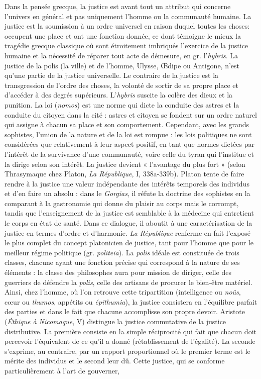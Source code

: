 Dans la pensée grecque, la justice est
avant tout un attribut qui concerne l’univers en général et pas uniquement
l’homme ou la communauté humaine. La
justice est la soumission à un ordre universel en raison duquel toutes les choses:
occupent une place et ont une fonction
donnée, ce dont témoigne le mieux la tragédie grecque classique où sont étroitement imbriqués l’exercice de la justice
humaine et la nécessité de réparer tout
acte de démesure, en gr. l’{\it hybris}. La justice de la polis (la ville) et de l’homme,
Ulysse, Œdipe ou Antigone, n’est qu’une
partie de la justice universelle. Le
contraire de la justice est la transgression
%
de l’ordre des choses, la volonté de sortir
de sa propre place et d'accéder à des
degrés supérieurs. L’{\it hybris} suscite la
colère des dieux et la punition. La loi
({\it nomos}) est une norme qui dicte la
conduite des astres et la conduite du
citoyen dans la cité : astres et citoyen se
fondent sur un ordre naturel qui assigne
à chacun sa place et son comportement.
Cependant, avec les grands sophistes,
l’union de la nature et de la loi est rompue : les lois politiques ne sont considérées que relativement à leur aspect positif,
en tant que normes dictées par l'intérêt
de la survivance d’une communauté, voire
celle du tyran qui l’institue et la dirige
selon son intérêt. La justice devient
« l'avantage du plus fort » (selon Thrasymaque chez Platon, {\it La République}, I,
338a-339b). Platon tente de faire rendre
à la justice une valeur indépendante des
intérêts temporels des individus et d’en
faire un absolu : dans le {\it Gorgias}, il réfute
la doctrine des sophistes en la comparant
à la gastronomie qui donne du plaisir au
corps mais le corrompt, tandis que l’enseignement de la justice est semblable à la
médecine qui entretient le corps en état
de santé. Dans ce dialogue, il aboutit à
une caractérisation de la justice en termes
d'ordre et d’harmonie. {\it La République}
renferme en fait l'exposé le plus complet
du concept platonicien de justice, tant
pour l’homme que pour le meilleur
régime politique (gr. {\it politeia}). La {\it polis}
idéale est constituée de trois classes, chacune ayant une fonction précise qui correspond à la nature de ses éléments : la
classe des philosophes aura pour mission
de diriger, celle des guerriers de défendre
la {\it polis}, celle des artisans de procurer le
bien-être matériel. Ainsi, chez l’homme,
où l’on retrouve cette tripartition (intelligence ou {\it noûs}, cœur ou {\it thumos}, appétits
ou {\it épithumia}), la justice consistera en
l'équilibre parfait des parties et dans le
fait que chacune accomplisse son propre
devoir. Aristote ({\it Éthique à Nicomaque},
V) distingue la justice commutative de la
justice distributive. La première consiste
en la simple réciprocité qui fait que chacun doit percevoir l’équivalent de ce qu'il
a donné (rétablissement de l'égalité). La
seconde s'exprime, au contraire, par un
rapport proportionnel où le premier
terme est le mérite des individus et le
second leur dû. Cette justice, qui se
conforme particulièrement à l’art de gouverner,

